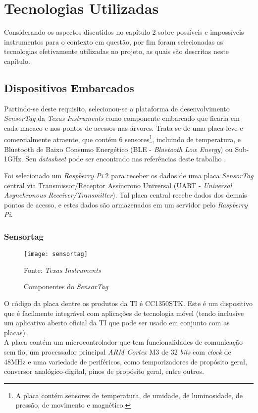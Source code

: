 \chapter{Tecnologias Utilizadas}
Considerando os aspectos discutidos no capítulo 2 sobre possíveis e impossíveis instrumentos para o contexto em questão, por fim foram selecionadas as tecnologias efetivamente utilizadas no projeto, as quais são descritas neste capítulo.

\section{Dispositivos Embarcados}

Partindo-se deste requisito, selecionou-se a plataforma de desenvolvimento \emph{SensorTag} da \emph{Texas Instruments} como componente embarcado que ficaria em cada macaco e nos pontos de acessos nas árvores. Trata-se de uma placa leve e comercialmente atraente, que contém 6 sensores\footnote{A placa contém sensores de temperatura, de umidade, de luminosidade, de pressão, de movimento e magnético.}, incluindo de temperatura, e Bluetooth de Baixo Consumo Energético (BLE - \emph{Bluetooth Low Energy}) ou Sub-1GHz. Seu \emph{datasheet} pode ser encontrado nas referências deste trabalho \cite{datasheet}.

Foi selecionado um \emph{Raspberry Pi} 2 para receber os dados de uma placa \emph{SensorTag} central via Transmissor/Receptor Assíncrono Universal (UART - \emph{Universal Asynchronous Receiver/Transmitter}). Tal placa central recebe dados dos demais pontos de acesso, e estes dados são armazenados em um servidor pelo \emph{Raspberry Pi}.

\subsection{Sensortag}

\begin{figure}[ht]
  \centering
  \caption{Componentes do \emph{SensorTag}}
    \texttt{[image: sensortag]}
  \centerline{\small{Fonte: \emph{Texas Instruments}}}
\end{figure}

O código da placa dentre os produtos da TI é CC1350STK. Este é um dispositivo que é facilmente integrável com aplicações de tecnologia móvel (tendo inclusive um aplicativo aberto oficial da TI que pode ser usado em conjunto com as placas).\\

A placa contém um microcontrolador que tem funcionalidades de comunicação sem fio, um processador principal \emph{ARM Cortex} M3 de 32 \emph{bits} com \emph{clock} de 48MHz e uma variedade de periféricos, como temporizadores de propósito geral, conversor analógico-digital, pinos de propósito geral, entre outros.

